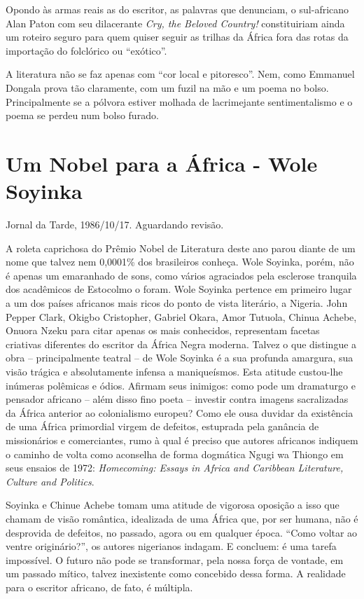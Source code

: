 \documentclass[
  letterpaper,
  DIV=11,
  numbers=noendperiod]{scrreprt}
\begin{document}
Opondo às armas reais as do escritor, as palavras que denunciam, o
sul-africano Alan Paton com seu dilacerante \emph{Cry, the Beloved
Country!} constituiriam ainda um roteiro seguro para quem quiser seguir
as trilhas da África fora das rotas da importação do folclórico ou
``exótico''.

A literatura não se faz apenas com ``cor local e pitoresco''. Nem, como
Emmanuel Dongala prova tão claramente, com um fuzil na mão e um poema no
bolso. Principalmente se a pólvora estiver molhada de lacrimejante
sentimentalismo e o poema se perdeu num bolso furado.

\chapter{Um Nobel para a África - Wole
Soyinka}\label{um-nobel-para-a-uxe1frica---wole-soyinka}

Jornal da Tarde, 1986/10/17. Aguardando revisão.

\hfill\break

A roleta caprichosa do Prêmio Nobel de Literatura deste ano parou diante
de um nome que talvez nem 0,0001\% dos brasileiros conheça. Wole
Soyinka, porém, não é apenas um emaranhado de sons, como vários
agraciados pela esclerose tranquila dos acadêmicos de Estocolmo o foram.
Wole Soyinka pertence em primeiro lugar a um dos países africanos mais
ricos do ponto de vista literário, a Nigeria. John Pepper Clark, Okigbo
Cristopher, Gabriel Okara, Amor Tutuola, Chinua Achebe, Onuora Nzeku
para citar apenas os mais conhecidos, representam facetas criativas
diferentes do escritor da África Negra moderna. Talvez o que distingue a
obra -- principalmente teatral -- de Wole Soyinka é a sua profunda
amargura, sua visão trágica e absolutamente infensa a maniqueísmos. Esta
atitude custou-lhe inúmeras polêmicas e ódios. Afirmam seus inimigos:
como pode um dramaturgo e pensador africano -- além disso fino poeta --
investir contra imagens sacralizadas da África anterior ao colonialismo
europeu? Como ele ousa duvidar da existência de uma África primordial
virgem de defeitos, estuprada pela ganância de missionários e
comerciantes, rumo à qual é preciso que autores africanos indiquem o
caminho de volta como aconselha de forma dogmática Ngugi wa Thiongo em
seus ensaios de 1972: \emph{Homecoming: Essays in Africa and Caribbean
Literature, Culture and Politics}.

Soyinka e Chinue Achebe tomam uma atitude de vigorosa oposição a isso
que chamam de visão romântica, idealizada de uma África que, por ser
humana, não é desprovida de defeitos, no passado, agora ou em qualquer
época. ``Como voltar ao ventre originário?'', os autores nigerianos
indagam. E concluem: é uma tarefa impossível. O futuro não pode se
transformar, pela nossa força de vontade, em um passado mítico, talvez
inexistente como concebido dessa forma. A realidade para o escritor
africano, de fato, é múltipla.
\end{document}
